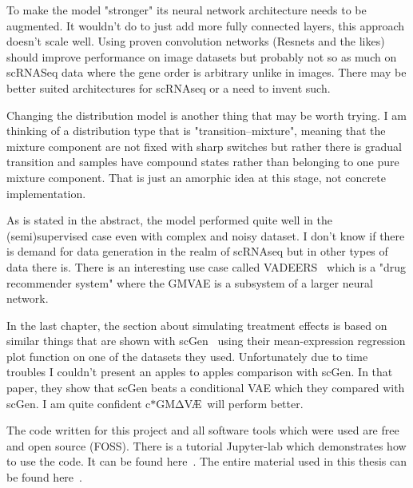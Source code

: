 \documentclass[11pt, a4paper]{report}
\theoremstyle{plain}
\theoremstyle{definition}
\theoremstyle{remark}
\newcommand{\gmvae}{c$\ast$GM$\mathrm{\Delta}$V\AE~}
\begin{document}
To make the model "stronger" its neural network architecture needs to be
augmented. It wouldn't do to just add more fully connected layers, this approach
doesn't scale well. Using proven convolution networks (Resnets and the likes)
should improve performance on image datasets but probably not so as much on
scRNASeq data where the gene order is arbitrary unlike in images. There may be
better suited architectures for scRNAseq or a need to invent such.

Changing the distribution model is another thing that may be worth trying. I am
thinking of a distribution type that is "transition--mixture", meaning that the
mixture component are not fixed with sharp switches but rather there is gradual
transition and samples have compound states rather than belonging to one pure
mixture component. That is just an amorphic idea at this stage, not concrete
implementation.

As is stated in the abstract, the model performed quite well in the
(semi)supervised case even with complex and noisy dataset. I don't know if there
is demand for data generation in the realm of scRNAseq but in other types of
data there is. There is an interesting use case called
VADEERS~\cite{koras2022generative} which is a "drug recommender system" where 
the GMVAE is a subsystem of a larger neural network.

In the last chapter, the section about simulating treatment effects is based
on similar things that are shown with scGen~\cite{lotfollahi2019scgen} using
their mean-expression regression plot function on one of
the datasets they used. Unfortunately due to time troubles I couldn't
present an apples to apples comparison with scGen. In that paper, they show
that scGen beats a conditional VAE which they compared with scGen. I am quite
confident \gmvae will perform better.

The code written for this project and all software tools which were used are
free and open source (FOSS).
There is a tutorial Jupyter-lab which demonstrates how to use the code. It can be found
here~\cite{mpgvaeRepo}.
The entire material used in this thesis can be found here~\cite{mg22Repo}.


\nocite{guo2017improved}
\nocite{kingma2013auto}


\printbibliography
\end{document}
